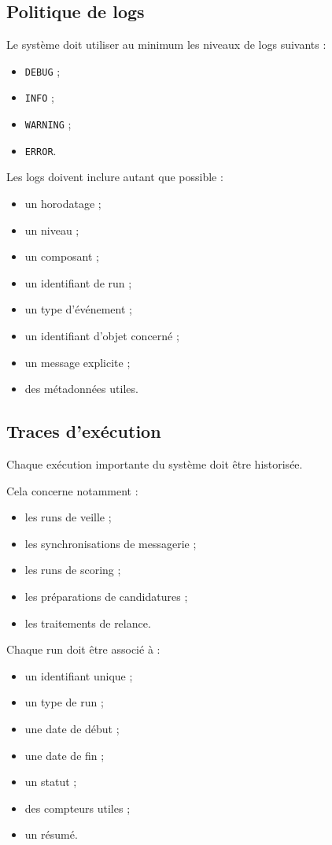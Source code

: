 \documentclass[11pt,a4paper]{article}
\begin{document}
\subsection{Politique de logs}

Le système doit utiliser au minimum les niveaux de logs suivants :

\begin{itemize}
    \item \texttt{DEBUG} ;
    \item \texttt{INFO} ;
    \item \texttt{WARNING} ;
    \item \texttt{ERROR}.
\end{itemize}

Les logs doivent inclure autant que possible :

\begin{itemize}
    \item un horodatage ;
    \item un niveau ;
    \item un composant ;
    \item un identifiant de run ;
    \item un type d’événement ;
    \item un identifiant d’objet concerné ;
    \item un message explicite ;
    \item des métadonnées utiles.
\end{itemize}

\subsection{Traces d’exécution}

Chaque exécution importante du système doit être historisée.

Cela concerne notamment :

\begin{itemize}
    \item les runs de veille ;
    \item les synchronisations de messagerie ;
    \item les runs de scoring ;
    \item les préparations de candidatures ;
    \item les traitements de relance.
\end{itemize}

Chaque run doit être associé à :

\begin{itemize}
    \item un identifiant unique ;
    \item un type de run ;
    \item une date de début ;
    \item une date de fin ;
    \item un statut ;
    \item des compteurs utiles ;
    \item un résumé.
\end{itemize}
\end{document}
